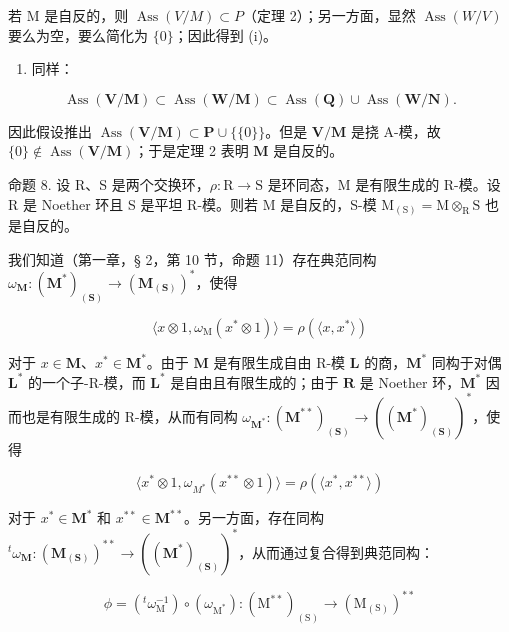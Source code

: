 若 M 是自反的，则 \(\operatorname{Ass}(V/M) \subset P\)（定理 2）；另一方面，显然 \(\operatorname{Ass}(W/V)\) 要么为空，要么简化为 \(\{0\}\)；因此得到 (i)。

\begin{enumerate}
\def\labelenumi{(\roman{enumi})}
\setcounter{enumi}{1}
\tightlist
\item
  同样：
\end{enumerate}

\[
\operatorname{Ass} (\mathbf {V} / \mathbf {M}) \subset \operatorname{Ass} (\mathbf {W} / \mathbf {M}) \subset \operatorname{Ass} (\mathbf {Q}) \cup \operatorname{Ass} (\mathbf {W} / \mathbf {N}).
\]

因此假设推出 \(\operatorname{Ass}(\mathbf{V} / \mathbf{M}) \subset \mathbf{P} \cup \{\{0\}\}\)。但是 \(\mathbf{V} / \mathbf{M}\) 是挠 A-模，故 \(\{0\} \notin \operatorname{Ass}(\mathbf{V} / \mathbf{M})\)；于是定理 2 表明 \(\mathbf{M}\) 是自反的。

命题 8. 设 R、S 是两个交换环，\(\rho: \mathrm{R} \to \mathrm{S}\) 是环同态，M 是有限生成的 R-模。设 R 是 Noether 环且 S 是平坦 R-模。则若 M 是自反的，S-模 \(\mathrm{M}_{(\mathrm{S})} = \mathrm{M} \otimes_{\mathrm{R}} \mathrm{S}\) 也是自反的。

我们知道（第一章，§ 2，第 10 节，命题 11）存在典范同构 \(\omega_{\mathbf{M}}\colon (\mathbf{M}^{*})_{(\mathbf{S})}\to (\mathbf{M}_{(\mathbf{S})})^{*}\)，使得

\[
\langle x \otimes 1, \omega_ {\mathrm{M}} (x ^ {*} \otimes 1) \rangle = \rho (\langle x, x ^ {*} \rangle)
\]

对于 \(x \in \mathbf{M}\)、\(x^{*} \in \mathbf{M}^{*}\)。由于 \(\mathbf{M}\) 是有限生成自由 R-模 \(\mathbf{L}\) 的商，\(\mathbf{M}^{*}\) 同构于对偶 \(\mathbf{L}^{*}\) 的一个子-R-模，而 \(\mathbf{L}^{*}\) 是自由且有限生成的；由于 \(\mathbf{R}\) 是 Noether 环，\(\mathbf{M}^{*}\) 因而也是有限生成的 R-模，从而有同构 \(\omega_{\mathbf{M}^{*}}: (\mathbf{M}^{**})_{(\mathbf{S})} \to ((\mathbf{M}^{*})_{(\mathbf{S})})^{*}\)，使得

\[
\langle x ^ {*} \otimes 1, \omega_ {M ^ {*}} (x ^ {* *} \otimes 1) \rangle = \rho (\langle x ^ {*}, x ^ {* *} \rangle)
\]

对于 \(x^{*} \in \mathbf{M}^{*}\) 和 \(x^{**} \in \mathbf{M}^{**}\)。另一方面，存在同构 \(^t\omega_{\mathbf{M}}: (\mathbf{M}_{(\mathbf{S})})^{**} \to ((\mathbf{M}^{*})_{(\mathbf{S})})^{*}\)，从而通过复合得到典范同构：

\[
\phi = \left(^ {t} \omega_ {\mathrm{M}} ^ {- 1}\right) \circ (\omega_ {\mathrm{M} ^ {*}}): (\mathrm{M} ^ {* *}) _ {(\mathrm{S})} \rightarrow (\mathrm{M} _ {(\mathrm{S})}) ^ {* *}
\]

